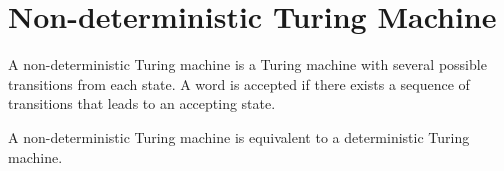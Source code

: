 \section{Non-deterministic Turing Machine} \label{sec:tm:ntm}
A non-deterministic Turing machine is a Turing machine with several
possible transitions from each state.
A word is accepted if there exists a sequence of transitions that leads
to an accepting state.
\begin{theorem*} \label{thm:tm:ntm}
    A non-deterministic Turing machine is equivalent to a deterministic
    Turing machine.
\end{theorem*}
